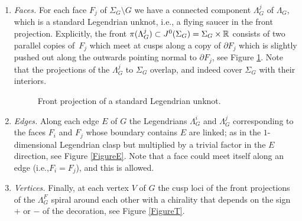\documentclass[11pt]{article}
\newcommand{\ie}{i.e.,\xspace}
\newcommand{\smaller}{\small}
\numberwithin{equation}{section}\providecommand{\dpl}{\displaystyle}
\theoremstyle{plain}
\theoremstyle{definition}
\begin{document}
\begin{enumerate}
\item
\textit{Faces.} For each face $F_j$ of $\Sigma_G \setminus G$ we have a connected component $\Lambda^j_G$ of $\Lambda_G$, which is a standard Legendrian unknot, \ie a flying saucer in the front projection. Explicitly, the front $\pi(\Lambda^j_G) \subset J^0(\Sigma_G)=\Sigma_G \times \mathbb{R}$ consists of two parallel copies of~$F_j$ which meet at cusps along a copy of $\partial F_j$ which is slightly pushed out along the outwards pointing normal to $\partial F_j$, see Figure \ref{FigureLens}. Note that the projections of the $\Lambda^j_G$ to $\Sigma_G$ overlap, and indeed cover $\Sigma_G$ with their interiors.

\begin{figure}[htbp]
\begin{center}
\caption{\smaller Front projection of a standard Legendrian unknot.}
\label{FigureLens}
\end{center}
\end{figure}

\item
\textit{Edges.} Along each edge $E$ of $G$ the Legendrians $\Lambda^{i}_G$ and $\Lambda^{j}_G$ corresponding to the faces $F_i$ and $F_j$ whose boundary contains $E$ are linked; as in the $1$-dimensional Legendrian clasp but multiplied by a trivial factor in the $E$ direction, see Figure \ref{FigureE}. Note that a face could meet itself along an edge (\ie $F_i=F_j$), and this is allowed.

\item
\textit{Vertices.} Finally, at each vertex $V$ of $G$ the cusp loci of the front projections of the $\Lambda^F_G$ spiral around each other with a chirality that depends on the sign $+$ or $-$ of the decoration, see Figure \ref{FigureT}.
\end{enumerate}
\end{document}
